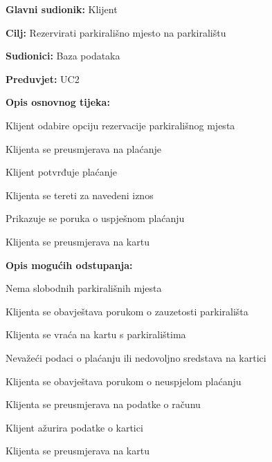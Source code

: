 \noindent {}
\begin{packed_item}
	
	\item \textbf{Glavni sudionik:} Klijent
	\item  \textbf{Cilj:} Rezervirati parkirališno mjesto na parkiralištu
	\item  \textbf{Sudionici:} Baza podataka
	\item  \textbf{Preduvjet:} UC2
	\item  \textbf{Opis osnovnog tijeka:}
	
	\item[] \begin{packed_enum}
		
		\item Klijent odabire opciju rezervacije parkirališnog mjesta
		\item Klijenta se preusmjerava na plaćanje
		\item Klijent potvrđuje plaćanje
		\item Klijenta se tereti za navedeni iznos
		\item Prikazuje se poruka o uspješnom plaćanju
		\item Klijenta se preusmjerava na kartu
		
	\end{packed_enum}
	\item  \textbf{Opis mogućih odstupanja:}
	\item[] \begin{packed_item}
		
		\item[1.a] Nema slobodnih parkirališnih mjesta
		\item[] \begin{packed_enum}
			
			\item Klijenta se obavještava porukom o zauzetosti parkirališta
			\item Klijenta se vraća na kartu s parkiralištima
			
		\end{packed_enum}
		
		\item[3.a] Nevažeći podaci o plaćanju ili nedovoljno sredstava na kartici
		\item[] \begin{packed_enum}
			
			\item Klijenta se obavještava porukom o neuspjelom plaćanju
			\item Klijenta se preusmjerava na podatke o računu
			\item Klijent ažurira podatke o kartici
			\item Klijenta se preusmjerava na kartu
			
		\end{packed_enum}
		
	\end{packed_item}
		
\end{packed_item}

